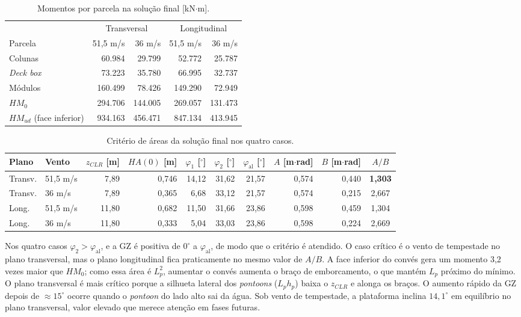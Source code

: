 \documentclass[11pt,a4paper]{article}
\newcommand{\phial}{\varphi_{\mathrm{al}}}
\begin{document}
\begin{table}[H]
\centering
\caption{Momentos por parcela na solução final [kN$\cdot$m].}\label{tab:momentos}
\small
\begin{tabular}{lrrrr}
\toprule
 & \multicolumn{2}{c}{Transversal} & \multicolumn{2}{c}{Longitudinal} \\
\cmidrule(lr){2-3}\cmidrule(lr){4-5}
Parcela & 51,5 m/s & 36 m/s & 51,5 m/s & 36 m/s \\
\midrule
Colunas & 60.984 & 29.799 & 52.772 & 25.787 \\
\emph{Deck box} & 73.223 & 35.780 & 66.995 & 32.737 \\
Módulos & 160.499 & 78.426 & 149.290 & 72.949 \\
\midrule
$HM_0$ & 294.706 & 144.005 & 269.057 & 131.473 \\
$HM_{ud}$ (face inferior) & 934.163 & 456.471 & 847.134 & 413.945 \\
\bottomrule
\end{tabular}
\end{table}

\begin{table}[H]
\centering
\caption{Critério de áreas da solução final nos quatro casos.}\label{tab:criterio}
\small\setlength{\tabcolsep}{4pt}
\begin{tabular}{llrrrrrrrc}
\toprule
Plano & Vento & $z_{CLR}$ [m] & $HA(0)$ [m] & $\varphi_1$ [$^\circ$] & $\varphi_2$ [$^\circ$] &
$\phial$ [$^\circ$] & $A$ [m$\cdot$rad] & $B$ [m$\cdot$rad] & $A/B$ \\
\midrule
Transv. & 51,5 m/s & 7,89 & 0,746 & 14,12 & 31,62 & 21,57 & 0,574 & 0,440 & \textbf{1,303} \\
Transv. & 36 m/s & 7,89 & 0,365 & 6,68 & 33,12 & 21,57 & 0,574 & 0,215 & 2,667 \\
Long. & 51,5 m/s & 11,80 & 0,682 & 11,50 & 31,66 & 23,86 & 0,598 & 0,459 & 1,304 \\
Long. & 36 m/s & 11,80 & 0,333 & 5,04 & 33,03 & 23,86 & 0,598 & 0,224 & 2,669 \\
\bottomrule
\end{tabular}
\end{table}

Nos quatro casos $\varphi_2 > \phial$, e a GZ é positiva de $0^\circ$ a $\phial$, de modo que o
critério é atendido. O caso crítico é o vento de tempestade no plano transversal, mas o plano
longitudinal fica praticamente no mesmo valor de $A/B$. A face inferior do convés gera um
momento 3,2 vezes maior que $HM_0$; como essa área é $L_p^2$, aumentar o convés aumenta o braço
de emborcamento, o que mantém $L_p$ próximo do mínimo. O plano transversal é mais crítico porque
a silhueta lateral dos \emph{pontoons} ($L_p h_p$) baixa o $z_{CLR}$ e alonga os braços. O
aumento rápido da GZ depois de $\approx 15^\circ$ ocorre quando o \emph{pontoon} do lado alto
sai da água. Sob vento de tempestade, a plataforma inclina $14{,}1^\circ$ em equilíbrio no plano
transversal, valor elevado que merece atenção em fases futuras.
\end{document}
